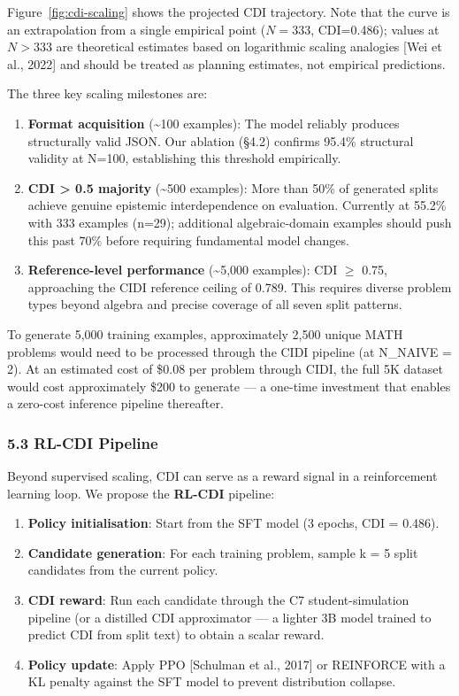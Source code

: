 \documentclass[
  11pt,
]{article}
\providecommand{\tightlist}{%
  \setlength{\itemsep}{0pt}\setlength{\parskip}{0pt}}
\begin{document}
Figure~\ref{fig:cdi-scaling} shows the projected CDI trajectory. Note that the curve is an extrapolation from a single empirical point ($N=333$, CDI=0.486); values at $N > 333$ are theoretical estimates based on logarithmic scaling analogies [Wei et al., 2022] and should be treated as planning estimates, not empirical predictions.

The three key scaling milestones are:

\begin{enumerate}
\def\labelenumi{\arabic{enumi}.}
\tightlist
\item
  \textbf{Format acquisition} (\textasciitilde100 examples): The model
  reliably produces structurally valid JSON. Our ablation (§4.2)
  confirms 95.4\% structural validity at N=100, establishing this
  threshold empirically.
\item
  \textbf{CDI \textgreater{} 0.5 majority} (\textasciitilde500
  examples): More than 50\% of generated splits achieve genuine
  epistemic interdependence on evaluation. Currently at 55.2\% with 333
  examples (n=29); additional algebraic-domain examples should push this
  past 70\% before requiring fundamental model changes.
\item
  \textbf{Reference-level performance} (\textasciitilde5,000 examples):
  CDI $\geq$ 0.75, approaching the CIDI reference ceiling of 0.789. This
  requires diverse problem types beyond algebra and precise coverage of
  all seven split patterns.
\end{enumerate}

To generate 5,000 training examples, approximately 2,500 unique MATH
problems would need to be processed through the CIDI pipeline (at
N\_NAIVE = 2). At an estimated cost of \$0.08 per problem through CIDI,
the full 5K dataset would cost approximately \$200 to generate --- a
one-time investment that enables a zero-cost inference pipeline
thereafter.

\subsubsection{5.3 RL-CDI Pipeline}\label{rl-cdi-pipeline}

Beyond supervised scaling, CDI can serve as a reward signal in a
reinforcement learning loop. We propose the \textbf{RL-CDI} pipeline:

\begin{enumerate}
\def\labelenumi{\arabic{enumi}.}
\tightlist
\item
  \textbf{Policy initialisation}: Start from the SFT model (3 epochs,
  CDI = 0.486).
\item
  \textbf{Candidate generation}: For each training problem, sample k = 5
  split candidates from the current policy.
\item
  \textbf{CDI reward}: Run each candidate through the C7
  student-simulation pipeline (or a distilled CDI approximator --- a
  lighter 3B model trained to predict CDI from split text) to obtain a
  scalar reward.
\item
  \textbf{Policy update}: Apply PPO [Schulman et al., 2017] or
  REINFORCE with a KL penalty against the SFT model to prevent
  distribution collapse.
\end{enumerate}
\end{document}
